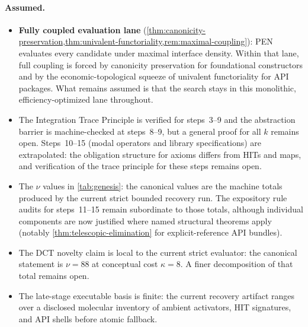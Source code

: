 \documentclass[11pt,a4paper]{article}
\theoremstyle{plain}
\theoremstyle{definition}
\theoremstyle{remark}
\begin{document}
\paragraph{Assumed.}
\begin{itemize}[nosep]
    \item \textbf{Fully coupled evaluation lane} (\cref{thm:canonicity-preservation,thm:univalent-functoriality,rem:maximal-coupling}): PEN evaluates every candidate under maximal interface density. Within that lane, full coupling is forced by canonicity preservation for foundational constructors and by the economic-topological squeeze of univalent functoriality for API packages. What remains assumed is that the search stays in this monolithic, efficiency-optimized lane throughout.
    \item The Integration Trace Principle is verified for steps~3--9 and the abstraction barrier is machine-checked at steps~8--9, but a general proof for all $k$ remains open.  Steps~10--15 (modal operators and library specifications) are extrapolated: the obligation structure for axioms differs from HITs and maps, and verification of the trace principle for these steps remains open.
    \item The $\nu$ values in \cref{tab:genesis}: the canonical values are the machine totals produced by the current strict bounded recovery run.  The expository rule audits for steps~11--15 remain subordinate to those totals, although individual components are now justified where named structural theorems apply (notably \cref{thm:telescopic-elimination} for explicit-reference API bundles).
    \item The DCT novelty claim is local to the current strict evaluator: the canonical statement is $\nu=88$ at conceptual cost $\kappa=8$.  A finer decomposition of that total remains open.
    \item The late-stage executable basis is finite: the current recovery artifact ranges over a disclosed molecular inventory of ambient activators, HIT signatures, and API shells before atomic fallback.
\end{itemize}
\end{document}
